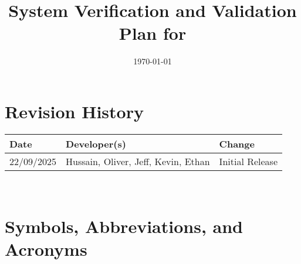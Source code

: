 \documentclass[12pt, titlepage]{article}
\begin{document}
\title{System Verification and Validation Plan for \progname{}}
\author{\authname}
\date{\today}

\maketitle


\section*{Revision History}

\begin{tabularx}{\textwidth}{llX}
\toprule {\bf Date} & {\bf Developer(s)} & {\bf Change}\\
\midrule
22/09/2025 & Hussain, Oliver, Jeff, Kevin, Ethan & Initial Release\\
\bottomrule
\end{tabularx}

~\\


\newpage

\tableofcontents




\newpage

\section{Symbols, Abbreviations, and Acronyms}
\end{document}
